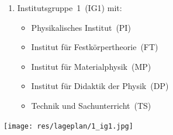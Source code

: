 {\large\RaggedRight
\begin{minipage}{0.54\textwidth}
	\begin{enumerate}[labelsep=*, leftmargin=1.2em, series=lageplan]
		\item Institutsgruppe~1~(IG1) mit:
		\begin{itemize}
			\item Physikalisches Institut~(PI)
			\item Institut für Festkörpertheorie~(FT)
			\item Institut für Materialphysik~(MP)
			\item Institut für Didaktik der Physik~(DP)
			\item Technik und Sachunterricht~(TS)
		\end{itemize}
	\end{enumerate}
\end{minipage}
\hfill
\begin{minipage}{0.45\textwidth}
	\centering
	\texttt{[image: res/lageplan/1\_ig1.jpg]}
\end{minipage}

\clearpage

}
